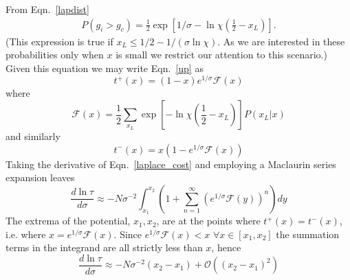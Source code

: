 \documentclass[aps,prl,twocolumn,showpacs,superscriptaddress,groupedaddress]{revtex4}
\begin{document}
From Eqn.~\ref{lapdist}
\begin{align}
P\left(g_i>g_c \right) =
\frac{1}{2}\exp{\left[1/\sigma - \ln\chi  \left(\frac{1}{2}-x_L\right)\right] }.%
\end{align}
(This expression is true if $x_L \le 1/2 - 1/(\sigma\ln\chi)$. As we are interested in these probabilities only when $x$ is small we restrict our attention to this scenario.) Given this equation we may write Eqn.~\ref{up} as
\begin{equation}
t^+(x) = (1-x)  e^{1/\sigma } \mathcal{F}(x)
\end{equation}
where 
\begin{equation}
 \mathcal{F}(x) = \frac{1}{2}\sum_{x_{L}}\exp{\left[ - \ln\chi  \left(\frac{1}{2}-x_L\right)\right]}P\left(x_{L}|x\right)
\end{equation}
and similarly 
\begin{equation}
t^-(x) =x \left(1-  e^{1/\sigma } \mathcal{F}(x)\right)
\end{equation}
Taking the derivative of Eqn.~\ref{laplace_cost} and employing a Maclaurin series expansion leaves
\begin{equation}
  \frac{d \ln \tau}{d \sigma} \approx - N \sigma^{-2} \int_{x_1}^{x_2} \left(1 + \sum_{n=1}^{\infty} \left(e^{1/\sigma } \mathcal{F}(y)\right)^n  \right) dy
\label{laplace_cost2}
\end{equation}
The extrema of the potential, $x_1,x_2$, are at the points where $t^+(x)=t^-(x)$, i.e. where $x=e^{1/\sigma } \mathcal{F}(x)$. Since $e^{1/\sigma } \mathcal{F}(x)<x$ $\forall x \in [x_1,x_2]$ the summation terms in the integrand are all strictly less than $x$, hence
\begin{equation}
  \frac{d \ln \tau}{d \sigma} \approx - N \sigma^{-2} \left({x_2}-{x_1}\right) + \mathcal{O}\left( \left(x_2-x_1\right)^2\right)
\label{laplace_cost2}
\end{equation}

%
%
%

\end{document}
